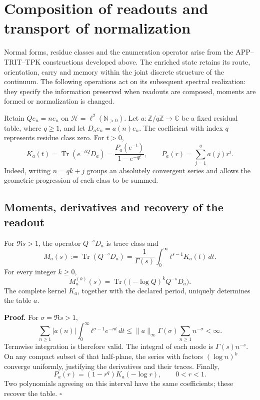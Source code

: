 \section{Composition of readouts and transport of normalization}
\label{ix-add:composicion-lectores}

Normal forms, residue classes and the enumeration operator arise from the
APP--TRIT--TPK constructions developed above. The enriched state retains its
route, orientation, carry and memory within the joint discrete structure of
the continuum. The following operations act on its subsequent spectral
realization: they specify the information preserved when readouts are
composed, moments are formed or normalization is changed.

Retain $Qe_n=ne_n$ on $\mathcal H=\ell^2(\mathbb N_{>0})$.
Let $a:\mathbb Z/q\mathbb Z\to\mathbb C$ be a fixed residual table,
where $q\geq1$, and let $D_ae_n=a(n)e_n$. The coefficient with index
$q$ represents residue class zero. For $t>0$,
\[
 K_a(t)=\operatorname{Tr}(e^{-tQ}D_a)
 =\frac{P_a(e^{-t})}{1-e^{-qt}},\qquad
 P_a(r)=\sum_{j=1}^{q}a(j)r^j.
\]
Indeed, writing $n=qk+j$ groups an absolutely convergent series and
allows the geometric progression of each class to be summed.

\subsection{Moments, derivatives and recovery of the readout}
For $\Re s>1$, the operator $Q^{-s}D_a$ is trace class and
\[
 M_a(s):=\operatorname{Tr}(Q^{-s}D_a)
 =\frac1{\Gamma(s)}\int_0^\infty t^{s-1}K_a(t)\,dt.
\]
For every integer $k\geq0$,
\[
 M_a^{(k)}(s)=\operatorname{Tr}\bigl((-\log Q)^kQ^{-s}D_a\bigr).
\]
The complete kernel $K_a$, together with the declared period, uniquely
determines the table $a$.

\textbf{Proof.} For $\sigma=\Re s>1$,
\[
 \sum_{n\geq1}|a(n)|\int_0^\infty
 t^{\sigma-1}e^{-nt}\,dt
 \leq\|a\|_\infty\Gamma(\sigma)\sum_{n\geq1}n^{-\sigma}<\infty.
\]
Termwise integration is therefore valid. The integral of each mode is
$\Gamma(s)n^{-s}$. On any compact subset of that half-plane, the
series with factors $(\log n)^k$ converge uniformly, justifying the
derivatives and their traces. Finally,
\[
 P_a(r)=(1-r^q)K_a(-\log r),\qquad 0<r<1.
\]
Two polynomials agreeing on this interval have the same coefficients;
these recover the table. \hfill$\square$

